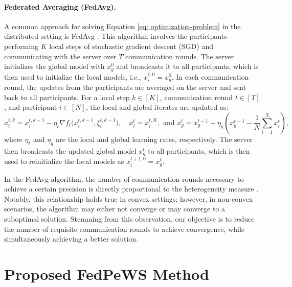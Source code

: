 \documentclass{article}
\begin{document}
\paragraph{Federated Averaging (FedAvg).} A common approach for solving Equation \ref{eq: optimization-problem} in the distributed setting is FedAvg \citep{mcmahan2017communication}. This algorithm involves the participants performing $K$ local steps of stochastic gradient descent (SGD) and communicating with the server over $T$ communication rounds. The server initializes the global model with $x_g^0$ and broadcasts it to all participants, which is then used to initialize the local models, i.e., $x_i^{1,0} = x_g^0$. In each communication round, the updates from the participants are averaged on the server and sent back to all participants. For a local step $k \in [K]$, communication round $t \in [T]$, and participant $i \in [N]$, the local and global iterates are updated as: 
\begin{equation}
    x_{i}^{t,k} = x_{i}^{t,k-1} - \eta_{\ell} \nabla f_i\big(x_i^{t,k-1}, \xi_i^{t,k-1}\big), \quad x_{i}^{t} = x_{i}^{t,K}, \text{ and  } x_g^{t} = x_g^{t-1} - \eta_g (x_g^{t-1} - \frac{1}{N} \sum_{i=1}^N x_{i}^{t}) , 
\end{equation}
\noindent where $\eta_{\ell}$ and $\eta_{g}$ are the local and global learning rates, respectively. The server then broadcasts the updated global model $x_g^{t}$ to all participants, which is then used to reinitialize the local models as $x_i^{t+1,0} = x_g^{t}$. 

In the FedAvg algorithm, the number of communication rounds necessary to achieve a certain precision is directly proportional to the heterogeneity measure \citep{li2019convergence}. Notably, this relationship holds true in convex settings; however, in non-convex scenarios, the algorithm may either not converge or may converge to a suboptimal solution. Stemming from this observation, our objective is to reduce the number of requisite communication rounds to achieve convergence, while simultaneously achieving a better solution. 



\section{Proposed FedPeWS Method}
\end{document}
